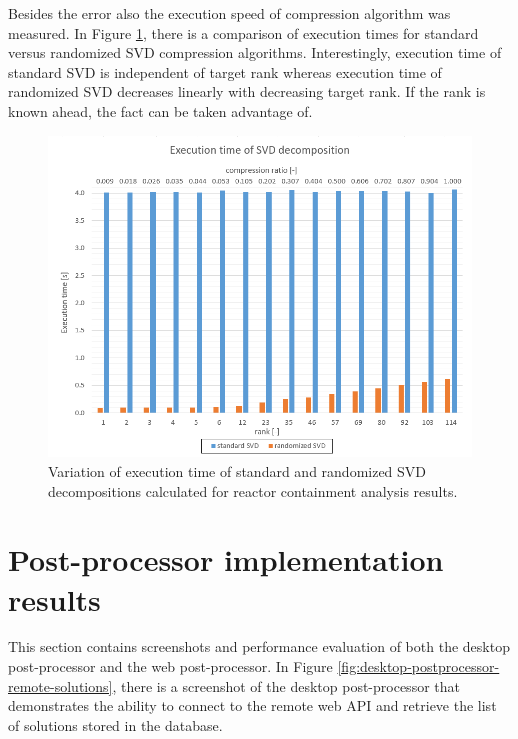 Besides the error also the execution speed of compression algorithm was measured. In Figure \ref{fig:temelin:ExeTime}, there is a comparison of execution times for standard versus randomized SVD compression algorithms. Interestingly, execution time of standard SVD is independent of target rank whereas execution time of randomized SVD decreases linearly with decreasing target rank. If the rank is known ahead, the fact can be taken advantage of.

\begin{figure}[H]
\centering
\includegraphics[width=\textwidth]{figures/chapter-SVD/temelin_ExecutionTime}
\decoRule
\caption[Execution time of standard and randomized SVD decompositions.]{Variation of execution time of standard and randomized SVD decompositions calculated for reactor containment analysis results.}
\label{fig:temelin:ExeTime}
\end{figure}

\section{Post-processor implementation results}


This section contains screenshots and performance evaluation of both the desktop post-processor and the web post-processor. In Figure \ref{fig:desktop-postprocessor-remote-solutions}, there is a screenshot of the desktop post-processor that demonstrates the ability to connect to the remote web API and retrieve the list of solutions stored in the database.

